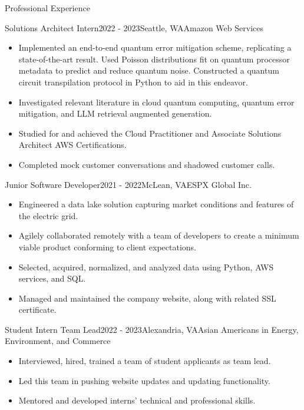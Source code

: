 \begin{rSection}{Professional Experience}

\begin{rSubsection}{Solutions Architect Intern}{2022 - 2023}{Seattle, WA}{\small{Amazon Web Services}}
\begin{itemize}
	\item Implemented an end-to-end quantum error mitigation scheme, replicating a state-of-the-art result. Used Poisson distributions fit on quantum processor metadata to predict and reduce quantum noise. Constructed a quantum circuit transpilation protocol in Python to aid in this endeavor.
	\item Investigated relevant literature in cloud quantum computing, quantum error mitigation, and LLM retrieval augmented generation.
	\item Studied for and achieved the Cloud Practitioner and Associate Solutions Architect AWS Certifications.
	\item Completed mock customer conversations and shadowed customer calls.
\end{itemize}
\end{rSubsection}
\begin{rSubsection}{Junior Software Developer}{2021 - 2022}{McLean, VA}{\small{ESPX Global Inc.}}
\begin{itemize}
	\item Engineered a data lake solution capturing market conditions and features of the electric grid.
	\item Agilely collaborated remotely with a team of developers to create a minimum viable product conforming to client expectations.
	\item Selected, acquired, normalized, and analyzed data using Python, AWS services, and SQL.
	\item Managed and maintained the company website, along with related SSL certificate.
\end{itemize}
\end{rSubsection}
\begin{rSubsection}{Student Intern Team Lead}{2022 - 2023}{Alexandria, VA}{\small{Asian Americans in Energy, Environment, and Commerce}}
\begin{itemize}
	\item Interviewed, hired, trained a team of student applicants as team lead.
	\item Led this team in pushing website updates and updating functionality.
	\item Mentored and developed interns' technical and professional skills.
\end{itemize}
\end{rSubsection}
\end{rSection}
